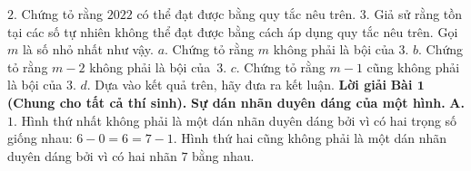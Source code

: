 \begin{multicols}{2}
	\vskip 0.05cm
	$2.$ Chứng tỏ rằng $2022$ có thể đạt được bằng quy tắc nêu trên. 
	\vskip 0.05cm
	$3.$ Giả sử rằng tồn tại các số tự nhiên không thể đạt được bằng cách áp dụng quy tắc nêu trên. Gọi $m$ là số nhỏ nhất như vậy.
	\vskip 0.05cm
	$a.$ Chứng tỏ rằng $m$ không phải là bội của $3$.
	\vskip 0.05cm
	$b.$ Chứng tỏ rằng $m-2$ không phải là bội của~$3$.
	\vskip 0.05cm
	$c.$ Chứng tỏ rằng $m-1$ cũng không phải là bội của $3$.
	\vskip 0.05cm
	$d.$ Dựa vào kết quả trên, hãy đưa ra kết luận. 
	\vskip 0.05cm
	\textbf{\color{cackithi}Lời giải}
	\vskip 0.05cm
	\textbf{\color{cackithi}Bài $\pmb{1}$ (Chung cho tất cả thí sinh).}
	\vskip 0.05cm
	\textbf{\color{cackithi}Sự dán nhãn duyên dáng của một hình.}
	\vskip 0.05cm
	\textbf{\color{cackithi}A.}
	$1.$ Hình thứ nhất không phải là một dán nhãn duyên dáng bởi vì có hai trọng số giống nhau: $6-0=6=7-1$. 
	Hình thứ hai cũng không phải là một dán nhãn duyên dáng bởi vì có hai nhãn $7$  bằng nhau. 

\end{multicols}
